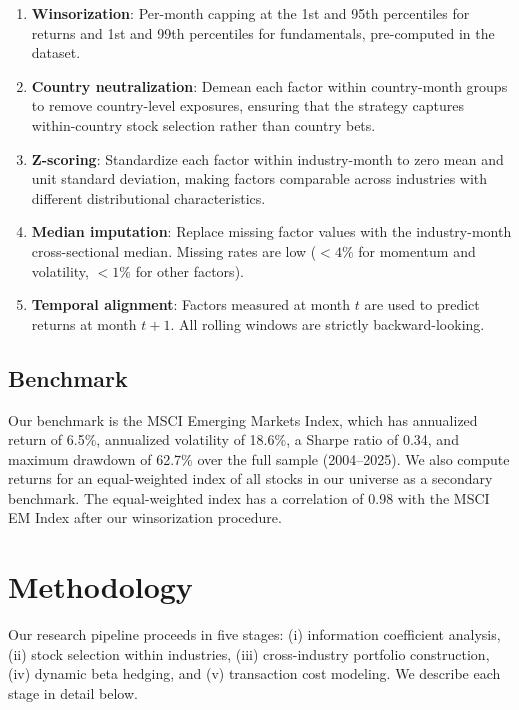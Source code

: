 \documentclass[12pt,a4paper]{article}
\begin{document}
\begin{enumerate}
    \item \textbf{Winsorization}: Per-month capping at the 1st and 95th percentiles for returns and 1st and 99th percentiles for fundamentals, pre-computed in the dataset.

    \item \textbf{Country neutralization}: Demean each factor within country-month groups to remove country-level exposures, ensuring that the strategy captures within-country stock selection rather than country bets.

    \item \textbf{Z-scoring}: Standardize each factor within industry-month to zero mean and unit standard deviation, making factors comparable across industries with different distributional characteristics.

    \item \textbf{Median imputation}: Replace missing factor values with the industry-month cross-sectional median. Missing rates are low ($<4\%$ for momentum and volatility, $<1\%$ for other factors).

    \item \textbf{Temporal alignment}: Factors measured at month $t$ are used to predict returns at month $t+1$. All rolling windows are strictly backward-looking.
\end{enumerate}

\subsection{Benchmark}

Our benchmark is the MSCI Emerging Markets Index, which has annualized return of 6.5\%, annualized volatility of 18.6\%, a Sharpe ratio of 0.34, and maximum drawdown of 62.7\% over the full sample (2004--2025). We also compute returns for an equal-weighted index of all stocks in our universe as a secondary benchmark. The equal-weighted index has a correlation of 0.98 with the MSCI EM Index after our winsorization procedure.


\section{Methodology}
\label{sec:method}

Our research pipeline proceeds in five stages: (i) information coefficient analysis, (ii) stock selection within industries, (iii) cross-industry portfolio construction, (iv) dynamic beta hedging, and (v) transaction cost modeling. We describe each stage in detail below.
\end{document}
